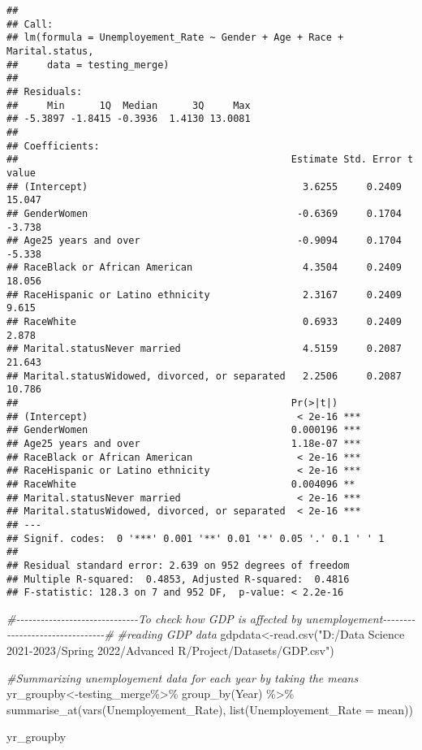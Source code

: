 \documentclass[
]{article}
\newenvironment{Shaded}{\begin{snugshade}}{\end{snugshade}}
\newcommand{\AttributeTok}[1]{\textcolor[rgb]{0.77,0.63,0.00}{#1}}
\newcommand{\CommentTok}[1]{\textcolor[rgb]{0.56,0.35,0.01}{\textit{#1}}}
\newcommand{\FunctionTok}[1]{\textcolor[rgb]{0.00,0.00,0.00}{#1}}
\newcommand{\NormalTok}[1]{#1}
\newcommand{\OtherTok}[1]{\textcolor[rgb]{0.56,0.35,0.01}{#1}}
\newcommand{\SpecialCharTok}[1]{\textcolor[rgb]{0.00,0.00,0.00}{#1}}
\newcommand{\StringTok}[1]{\textcolor[rgb]{0.31,0.60,0.02}{#1}}
\begin{document}
\begin{verbatim}
## 
## Call:
## lm(formula = Unemployement_Rate ~ Gender + Age + Race + Marital.status, 
##     data = testing_merge)
## 
## Residuals:
##     Min      1Q  Median      3Q     Max 
## -5.3897 -1.8415 -0.3936  1.4130 13.0081 
## 
## Coefficients:
##                                               Estimate Std. Error t value
## (Intercept)                                     3.6255     0.2409  15.047
## GenderWomen                                    -0.6369     0.1704  -3.738
## Age25 years and over                           -0.9094     0.1704  -5.338
## RaceBlack or African American                   4.3504     0.2409  18.056
## RaceHispanic or Latino ethnicity                2.3167     0.2409   9.615
## RaceWhite                                       0.6933     0.2409   2.878
## Marital.statusNever married                     4.5159     0.2087  21.643
## Marital.statusWidowed, divorced, or separated   2.2506     0.2087  10.786
##                                               Pr(>|t|)    
## (Intercept)                                    < 2e-16 ***
## GenderWomen                                   0.000196 ***
## Age25 years and over                          1.18e-07 ***
## RaceBlack or African American                  < 2e-16 ***
## RaceHispanic or Latino ethnicity               < 2e-16 ***
## RaceWhite                                     0.004096 ** 
## Marital.statusNever married                    < 2e-16 ***
## Marital.statusWidowed, divorced, or separated  < 2e-16 ***
## ---
## Signif. codes:  0 '***' 0.001 '**' 0.01 '*' 0.05 '.' 0.1 ' ' 1
## 
## Residual standard error: 2.639 on 952 degrees of freedom
## Multiple R-squared:  0.4853, Adjusted R-squared:  0.4816 
## F-statistic: 128.3 on 7 and 952 DF,  p-value: < 2.2e-16
\end{verbatim}

\begin{Shaded}
\begin{Highlighting}[]
\CommentTok{\#{-}{-}{-}{-}{-}{-}{-}{-}{-}{-}{-}{-}{-}{-}{-}{-}{-}{-}{-}{-}{-}{-}{-}{-}{-}{-}{-}{-}{-}{-}To check how GDP is affected by unemployement{-}{-}{-}{-}{-}{-}{-}{-}{-}{-}{-}{-}{-}{-}{-}{-}{-}{-}{-}{-}{-}{-}{-}{-}{-}{-}{-}{-}{-}{-}{-}{-}\#}
\CommentTok{\#reading GDP data}
\NormalTok{gdpdata}\OtherTok{\textless{}{-}}\FunctionTok{read.csv}\NormalTok{(}\StringTok{"D:/Data Science 2021{-}2023/Spring 2022/Advanced R/Project/Datasets/GDP.csv"}\NormalTok{)}
 
\CommentTok{\#Summarizing unemployement data for each year by taking the means}
\NormalTok{yr\_groupby}\OtherTok{\textless{}{-}}\NormalTok{testing\_merge}\SpecialCharTok{\%\textgreater{}\%}
  \FunctionTok{group\_by}\NormalTok{(Year) }\SpecialCharTok{\%\textgreater{}\%} 
  \FunctionTok{summarise\_at}\NormalTok{(}\FunctionTok{vars}\NormalTok{(Unemployement\_Rate), }\FunctionTok{list}\NormalTok{(}\AttributeTok{Unemployement\_Rate =}\NormalTok{ mean))}

\NormalTok{yr\_groupby}
\end{Highlighting}
\end{Shaded}
\end{document}
